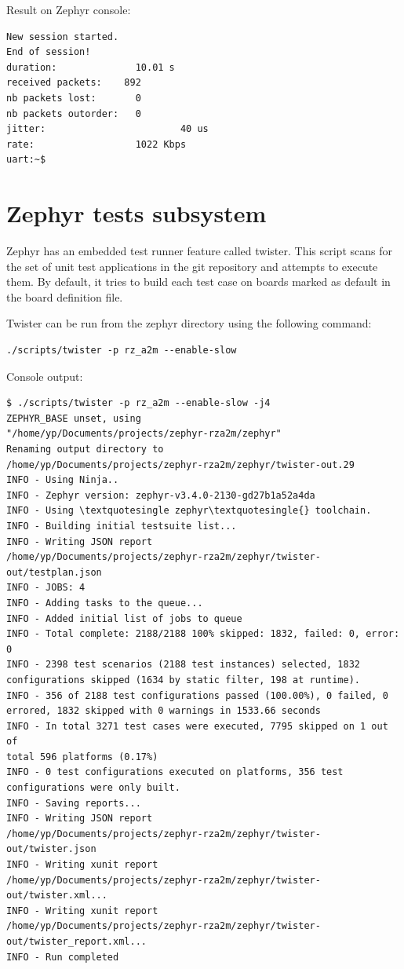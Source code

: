 \documentclass[11pt,a4paper,oneside]{article}
\begin{document}
Result on Zephyr console:
\begin{lstlisting}
New session started.
End of session!
duration:              10.01 s
received packets:    892
nb packets lost:       0
nb packets outorder:   0
jitter:                        40 us
rate:                  1022 Kbps
uart:~$
\end{lstlisting}

\section{Zephyr tests subsystem}\label{zephyr-tests-subsystem}

Zephyr has an embedded test runner feature called twister. This script
scans for the set of unit test applications in the git repository and
attempts to execute them. By default, it tries to build each test case
on boards marked as default in the board definition file.

Twister can be run from the zephyr directory using the following
command:

\begin{lstlisting}
./scripts/twister -p rz_a2m --enable-slow
\end{lstlisting}

Console output:

\begin{lstlisting}
$ ./scripts/twister -p rz_a2m --enable-slow -j4
ZEPHYR_BASE unset, using
"/home/yp/Documents/projects/zephyr-rza2m/zephyr"
Renaming output directory to
/home/yp/Documents/projects/zephyr-rza2m/zephyr/twister-out.29
INFO - Using Ninja..
INFO - Zephyr version: zephyr-v3.4.0-2130-gd27b1a52a4da
INFO - Using \textquotesingle zephyr\textquotesingle{} toolchain.
INFO - Building initial testsuite list...
INFO - Writing JSON report
/home/yp/Documents/projects/zephyr-rza2m/zephyr/twister-out/testplan.json
INFO - JOBS: 4
INFO - Adding tasks to the queue...
INFO - Added initial list of jobs to queue
INFO - Total complete: 2188/2188 100% skipped: 1832, failed: 0, error:
0
INFO - 2398 test scenarios (2188 test instances) selected, 1832
configurations skipped (1634 by static filter, 198 at runtime).
INFO - 356 of 2188 test configurations passed (100.00%), 0 failed, 0
errored, 1832 skipped with 0 warnings in 1533.66 seconds
INFO - In total 3271 test cases were executed, 7795 skipped on 1 out of
total 596 platforms (0.17%)
INFO - 0 test configurations executed on platforms, 356 test
configurations were only built.
INFO - Saving reports...
INFO - Writing JSON report
/home/yp/Documents/projects/zephyr-rza2m/zephyr/twister-out/twister.json
INFO - Writing xunit report
/home/yp/Documents/projects/zephyr-rza2m/zephyr/twister-out/twister.xml...
INFO - Writing xunit report
/home/yp/Documents/projects/zephyr-rza2m/zephyr/twister-out/twister_report.xml...
INFO - Run completed
\end{lstlisting}
\end{document}
